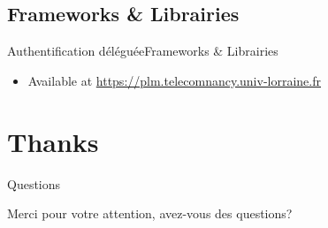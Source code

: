 \documentclass{beamer}
\begin{document}
\subsection{Frameworks \& Librairies}

\begin{frame}{Authentification déléguée}{Frameworks \& Librairies}
  \begin{center}
    \begin{itemize}
    \item Available at \url{https://plm.telecomnancy.univ-lorraine.fr}
    \end{itemize}
  \end{center}
\end{frame}

\section*{Thanks}

\begin{frame}{Questions}
  \begin{center}
    Merci pour votre attention, avez-vous des questions?
  \end{center}
\end{frame}
\end{document}
